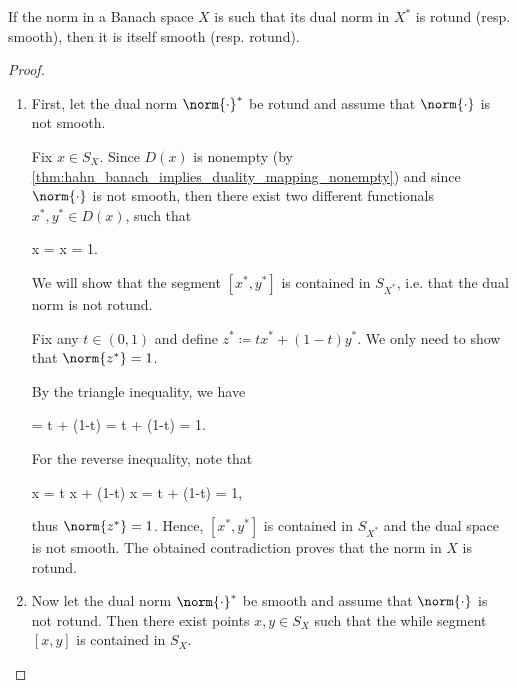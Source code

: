 \begin{theorem}\label{thm:smooth_rotund_norm_duality}
  If the norm in a Banach space \( X \) is such that its dual norm in \( X^* \) is rotund (resp. smooth), then it is itself smooth (resp. rotund).
\end{theorem}
\begin{proof}
  \begin{enumerate}
    \item First, let the dual norm \( \norm{\cdot}^* \) be rotund and assume that \( \norm{\cdot} \) is not smooth.

          Fix \( x \in S_X \). Since \( D(x) \) is nonempty (by \cref{thm:hahn_banach_implies_duality_mapping_nonempty}) and since \( \norm{\cdot} \) is not smooth, then there exist two different functionals \( x^*, y^* \in D(x) \), such that
          \begin{balign*}
             x
            =
             x
            =
            1.
          \end{balign*}

          We will show that the segment \( [x^*, y^*] \) is contained in \( S_{X^*} \), i.e. that the dual norm is not rotund.

          Fix any \( t \in (0, 1) \) and define \( z^* \coloneqq t x^* + (1-t) y^* \). We only need to show that \( \norm{z^*} = 1 \).

          By the triangle inequality, we have
          \begin{balign*}
            =
            \leq
            t  + (1-t) 
            =
            t + (1-t)
            =
            1.
          \end{balign*}

          For the reverse inequality, note that
          \begin{balign*}
            \geq
             x
            =
            t  x + (1-t)  x
            =
            t + (1-t)
            =
            1,
          \end{balign*}
          thus \( \norm{z^*} = 1 \). Hence, \( [x^*, y^*] \) is contained in \( S_{X^*} \) and the dual space is not smooth. The obtained contradiction proves that the norm in \( X \) is rotund.

    \item Now let the dual norm \( \norm{\cdot}^* \) be smooth and assume that \( \norm{\cdot} \) is not rotund. Then there exist points \( x, y \in S_X \) such that the while segment \( [x, y] \) is contained in \( S_X \).


\end{enumerate}
\end{proof}

